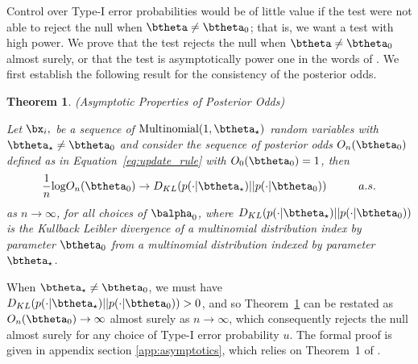 \documentclass[11pt]{article}
\def\log{{\rm log}}
\newtheorem{thm}{Theorem}[section]
\begin{document}
Control over Type-I error probabilities would be of little value if the test were not able to reject the null when $\btheta \neq \btheta_0$; that is, we want a test with high power. We prove that the test rejects the null when $\btheta \neq \btheta_0$ almost surely, or that the test is asymptotically power one in the words of \cite{robbins}.
We first establish the following result for the consistency of the posterior odds.
\begin{thm}(Asymptotic Properties of Posterior Odds)
  
  \label{thm:consistency}
\noindent Let $\bx_i,$ be a sequence of $\text{Multinomial}(1,\btheta_{\star})$ random variables with $\btheta_{\star} \neq \btheta_0$ and consider the sequence of posterior odds $O_n(\btheta_0)$ defined as in Equation~\ref{eq:update_rule} with $O_0(\btheta_0)=1$, then
\begin{equation}
  \label{eq:consistency}
  \frac{1}{n} \log O_n(\btheta_0) \rightarrow D_{KL}(p(\cdot|\btheta_{\star}) || p(\cdot|\btheta_0)) \hspace{1cm} a.s.
\end{equation}
as $ n \rightarrow \infty$, for all choices of $\balpha_0$, where $D_{KL}(p(\cdot|\btheta_{\star}) || p(\cdot|\btheta_0))$ is the Kullback Leibler divergence of a multinomial distribution index by parameter $\btheta_0$ from a multinomial distribution indexed by parameter $\btheta_{\star}$.
\end{thm}
\noindent When $\btheta_{\star} \neq \btheta_0$, we must have $D_{KL}(p(\cdot|\btheta_{\star}) || p(\cdot|\btheta_0)) > 0$, and so Theorem~\ref{thm:consistency} can be restated as $O_n(\btheta_0) \rightarrow \infty$ almost surely as $ n \rightarrow \infty$, which consequently rejects the null almost surely for any choice of Type-I error probability $u$.
The formal proof is given in appendix section \ref{app:asymptotics}, which relies on Theorem~1 of \cite{walker}.
\end{document}
